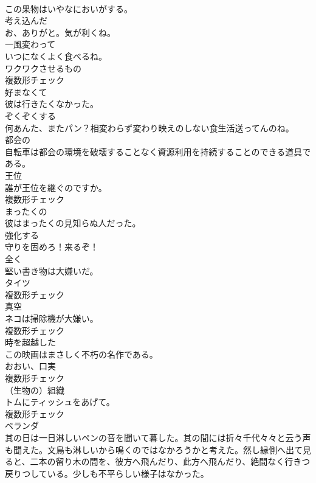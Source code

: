 \documentclass[8pt]{extreport}
\begin{document}
\begin{CJK}{UTF8}{min}
\\	この果物はいやなにおいがする。	
\\	[形容詞]	考え込んだ	
\\	お、ありがと。気が利くね。	
\\	[副詞]	一風変わって	
\\	いつになくよく食べるね。	
\\	[名詞]	ワクワクさせるもの	
\\	複数形チェック
\\	[形容詞]	好まなくて	
\\	彼は行きたくなかった。	
\\	[形容詞]	ぞくぞくする	
\\	何あんた、またパン？相変わらず変わり映えのしない食生活送ってんのね。	
\\	[形容詞]	都会の	
\\	自転車は都会の環境を破壊することなく資源利用を持続することのできる道具である。	
\\	[名詞]	王位	
\\	誰が王位を継ぐのですか。	
\\	複数形チェック
\\	[形容詞]	まったくの	
\\	彼はまったくの見知らぬ人だった。	
\\	[動詞]	強化する	
\\	守りを固めろ！来るぞ！	
\\	[副詞]	全く	
\\	堅い書き物は大嫌いだ。	
\\	[名詞]	タイツ	
\\	複数形チェック
\\	[名詞]	真空	
\\	ネコは掃除機が大嫌い。	
\\	複数形チェック
\\	[形容詞]	時を超越した	
\\	この映画はまさしく不朽の名作である。	
\\	[名詞]	おおい、口実	
\\	複数形チェック
\\	[名詞]	（生物の）組織	
\\	トムにティッシュをあげて。	
\\	複数形チェック
\\	[名詞]	ベランダ	
\\	其の日は一日淋しいペンの音を聞いて暮した。其の間には折々千代々々と云う声も聞えた。文鳥も淋しいから鳴くのではなかろうかと考えた。然し縁側へ出て見ると、二本の留り木の間を、彼方へ飛んだり、此方へ飛んだり、絶間なく行きつ戻りつしている。少しも不平らしい様子はなかった。	

\end{CJK}
\end{document}
